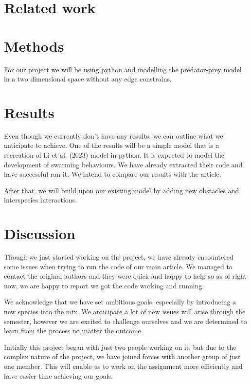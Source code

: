 \documentclass[9pt]{pnas-new}
\begin{document}
\section*{Related work}



\section*{Methods}

For our project we will be using python and modelling the predator-prey model in a two dimensional space without any edge constrains. 


\section*{Results}
Even though we currently don't have any results, we can outline what we anticipate to achieve. One of the results will be a simple model that is a recreation of Li et al. (2023) model in python. It is expected to model the development of swarming behaviours.  We have already extracted their code and have successful ran it. We intend to compare our results with the article.

After that, we will build upon our existing model by adding new obstacles and interspecies interactions. 

\section*{Discussion}
Though we just started working on the project, we have already encountered some issues when trying to run the code of our main article. We managed to contact the original authors and they were quick and happy to help so as of right now, we are happy to report we got the code working and running. 

We acknowledge that we have set ambitious goals, especially by introducing a new species into the mix. We anticipate a lot of new issues will arise through the semester, however we are excited to challenge ourselves and we are determined to learn from the process no matter the outcome.

Initially this project began with just two people working on it, but due to the complex nature of the project, we have joined forces with another group of just one member. This will enable us to work on the assignment more efficiently and have easier time achieving our goals.


\showacknow %


\begin{multicols}{2}
\end{multicols}
\end{document}
